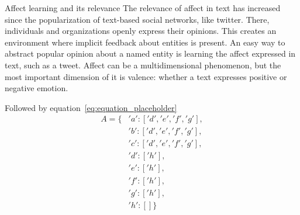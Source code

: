 Affect learning and its relevance
The relevance of affect in text has increased since the popularization of text-based social networks, like twitter. There, individuals and organizations openly express their opinions. This creates an environment where implicit feedback about entities is present. An easy way to abstract popular opinion about a named entity is learning the affect expressed in text, such as a tweet. Affect can be a multidimensional phenomenon, but the most important dimension of it is valence: whether a text expresses positive or negative emotion.





Followed by equation~\ref{eq:equation_placeholder}
\begin{equation} \label{eq:equation_placeholder}
  \begin{split}
    A = \{&'a':['d','e','f','g'], \\
         &'b':['d','e','f','g'], \\
         &'c':['d','e','f','g'], \\
         &'d':['h'], \\
         &'e':['h'], \\
         &'f':['h'], \\
         &'g':['h'], \\
         &'h':[] \}
  \end{split}
\end{equation}
